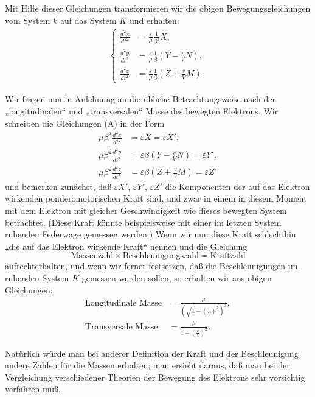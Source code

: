 \documentclass[17pt]{webarticle}       %
\begin{document}
Mit Hilfe dieser Gleichungen transformieren wir die obigen Bewegungsgleichungen vom System \( k \) auf das System \( K \) und erhalten:
\[
\begin{align} \tag{A}
\left\{
\begin{split}
\frac{d^2 x}{dt^2} &= \frac{\varepsilon}{\mu} \frac{1}{\beta^3} X,
\\
\frac{d^2 y}{dt^2} &= \frac{\varepsilon}{\mu} \frac{1}{\beta} \left( Y - \frac{v}{V} N \right),
\\
\frac{d^2 z}{dt^2} &= \frac{\varepsilon}{\mu} \frac{1}{\beta} \left( Z + \frac{v}{V} M \right).
\end{split}
\right.
\end{align}
\]

Wir fragen nun in Anlehnung an die übliche Betrachtungsweise nach der „longitudinalen“ und „transversalen“ Masse des bewegten Elektrons. Wir schreiben die Gleichungen (A) in der Form
\[
\begin{align*}
\mu \beta^3 \frac{d^2x}{dt^2} &= \varepsilon X = \varepsilon X', 
\\
\mu \beta^2 \frac{d^2y}{dt^2} &= \varepsilon \beta \left( Y - \frac{v}{V} N \right) = \varepsilon Y', 
\\
\mu \beta^2 \frac{d^2z}{dt^2} &= \varepsilon \beta \left( Z + \frac{v}{V} M \right) = \varepsilon Z'
\end{align*}
\]
und bemerken zunächst, daß \(\varepsilon X'\), \(\varepsilon Y'\), \(\varepsilon Z'\) die Komponenten der auf das Elektron wirkenden ponderomotorischen Kraft sind, und zwar in einem in diesem Moment mit dem Elektron mit gleicher Geschwindigkeit wie dieses bewegten System betrachtet. (Diese Kraft könnte beispielsweise mit einer im letzten System ruhenden Federwage gemessen werden.) Wenn wir nun diese Kraft schlechthin „die auf das Elektron wirkende Kraft“ nennen und die Gleichung 
\[
\text{Massenzahl} \times \text{Beschleunigungszahl} = \text{Kraftzahl}
\]
aufrechterhalten, und wenn wir ferner festsetzen, daß die Beschleunigungen im ruhenden System \( K \) gemessen werden sollen, so erhalten wir aus obigen Gleichungen:
\[
\begin{align*}
\text{Longitudinale Masse} &= \frac{\mu}{\left( \sqrt{1 - \left(\frac{v}{V}\right)^2} \right)^3},
\\
\text{Transversale Masse} &= \frac{\mu}{1 - \left( \frac{v}{V} \right)^2}.
\end{align*}
\]

Natürlich würde man bei anderer Definition der Kraft und der Beschleunigung andere Zahlen für die Massen erhalten; man ersieht daraus, daß man bei der Vergleichung verschiedener Theorien der Bewegung des Elektrons sehr vorsichtig verfahren muß.
\end{document}
